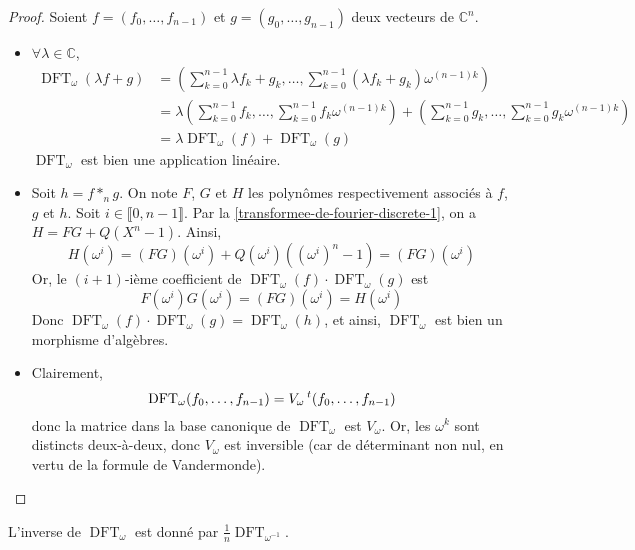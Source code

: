   \begin{proof}
    Soient $f = (f_0, \dots, f_{n-1})$ et $g = (g_0, \dots, g_{n-1})$ deux vecteurs de $\mathbb{C}^n$.
    \begin{itemize}
      \item $\forall \lambda \in \mathbb{C}$,
      \begin{align*}
        \operatorname{DFT}_\omega(\lambda f + g) &= \left(\sum_{k=0}^{n-1} \lambda f_k + g_k, \dots, \sum_{k=0}^{n-1} (\lambda f_k + g_k) \omega^{(n-1)k} \right) \\
        &= \lambda \left(\sum_{k=0}^{n-1} f_k, \dots, \sum_{k=0}^{n-1} f_k \omega^{(n-1)k} \right) + \left(\sum_{k=0}^{n-1} g_k, \dots, \sum_{k=0}^{n-1} g_k \omega^{(n-1)k} \right) \\
        &= \lambda \operatorname{DFT}_\omega(f) + \operatorname{DFT}_\omega(g)
      \end{align*}
      $\operatorname{DFT}_\omega$ est bien une application linéaire.
      \item Soit $h = f *_n g$. On note $F$, $G$ et $H$ les polynômes respectivement associés à $f$, $g$ et $h$.
      \newpar
      Soit $i \in \llbracket 0, n-1 \rrbracket$. Par la \cref{transformee-de-fourier-discrete-1}, on a $H = FG + Q(X^n - 1)$. Ainsi,
      \[ H(\omega^i) = (FG)(\omega^i) + Q(\omega^i)((\omega^i)^n - 1) = (FG)(\omega^i) \]
      Or, le $(i + 1)$-ième coefficient de $\operatorname{DFT}_\omega(f) \cdot \operatorname{DFT}_\omega(g)$ est
      \[ F(\omega^i) G(\omega^i) = (FG)(\omega^i) = H(\omega^i) \]
      Donc $\operatorname{DFT}_\omega(f) \cdot \operatorname{DFT}_\omega(g) = \operatorname{DFT}_\omega(h)$, et ainsi, $\operatorname{DFT}_\omega$ est bien un morphisme d'algèbres.
      \item Clairement,
      \[ \operatorname{DFT}_\omega(f_0, \dots, f_{n-1}) = V_\omega \, \mathstrut ^t (f_0, \dots, f_{n-1}) \]
      donc la matrice dans la base canonique de $\operatorname{DFT}_\omega$ est $V_\omega$. Or, les $\omega^k$ sont distincts deux-à-deux, donc $V_\omega$ est inversible (car de déterminant non nul, en vertu de la formule de Vandermonde).
    \end{itemize}
  \end{proof}

  \begin{proposition}
    \label{transformee-de-fourier-discrete-3}
    L'inverse de $\operatorname{DFT}_\omega$ est donné par $\frac{1}{n} \operatorname{DFT}_{\omega^{-1}}$.
  \end{proposition}

